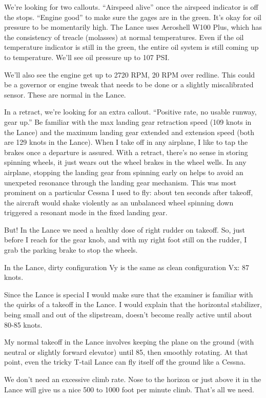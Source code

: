 We're looking for two callouts. ``Airspeed alive'' once the airspeed indicator is off the stops. ``Engine good'' to make sure the gages are in the green. It's okay for oil pressure to be momentarily high. The Lance uses Aeroshell W100 Plus, which has the consistency of treacle (molasses) at normal temperatures. Even if the oil temperature indicator is still in the green, the entire oil system is still coming up to temperature. We'll see oil pressure up to 107 PSI.

We'll also see the engine get up to 2720 RPM, 20 RPM over redline. This could be a governor or engine tweak that needs to be done or a slightly miscalibrated sensor. These are normal in the Lance.

In a retract, we're looking for an extra callout. ``Positive rate, no usable runway, gear up.'' Be familiar with the max landing gear retraction speed (109 knots in the Lance) and the maximum landing gear extended and extension speed (both are 129 knots in the Lance). When I take off in any airplane, I like to tap the brakes once a departure is assured. With a retract, there's no sense in storing spinning wheels, it just wears out the wheel brakes in the wheel wells. In any airplane, stopping the landing gear from spinning early on helps to avoid an unexpeted resonance through the landing gear mechanism. This was most prominent on a particular Cessna I used to fly: about ten seconds after takeoff, the aircraft would shake violently as an unbalanced wheel spinning down triggered a resonant mode in the fixed landing gear.

But! In the Lance we need a healthy dose of right rudder on takeoff. So, just before I reach for the gear knob, and with my right foot still on the rudder, I grab the parking brake to stop the wheels.

In the Lance, dirty configuration Vy is the same as clean configuration Vx: 87 knots.

Since the Lance is special I would make sure that the examiner is familiar with the quirks of a takeoff in the Lance. I would explain that the horizontal stabilizer, being small and out of the slipstream, doesn't become really active until about 80-85 knots.

My normal takeoff in the Lance involves keeping the plane on the ground (with neutral or slightly forward elevator) until 85, then smoothly rotating. At that point, even the tricky T-tail Lance can fly itself off the ground like a Cessna.

We don't need an excessive climb rate. Nose to the horizon or just above it in the Lance will give us a nice 500 to 1000 foot per minute climb. That's all we need.

